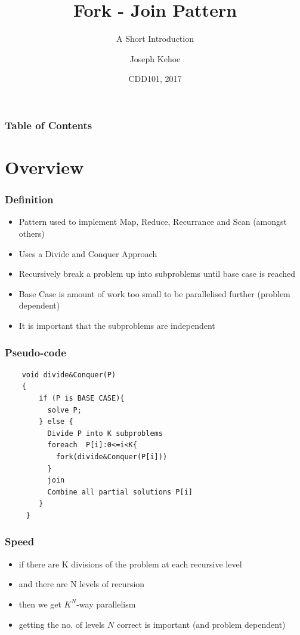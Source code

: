 \documentclass{beamer}
\title[Fork-Join] %
{Fork - Join Pattern}
\subtitle{A Short Introduction}
\author[Dr. Joseph Kehoe] %
{Joseph Kehoe\inst{1}}
\institute[IT Carlow] %
{
	\inst{1}%
	Department of Computing and Networking\\
	Institute of Technology Carlow
}
\date[ITC 2017] %
{CDD101, 2017}
\begin{document}
 
\frame{\titlepage}
 
 
 
 \begin{frame}
 	\frametitle{Table of Contents}
 	\tableofcontents
 \end{frame}
 
 
 \section{Overview}
\begin{frame}
\frametitle{Definition}

\begin{itemize}
	\item Pattern used to implement Map, Reduce, Recurrance and Scan (amongst others)
	\item Uses a Divide and Conquer Approach
	\item Recursively break a problem up into subproblems until base case is reached
	\item Base Case is amount of work too small to be parallelised further (problem dependent)
	\item It is important that the subproblems are independent
\end{itemize}
\end{frame}


 \begin{frame}[fragile=singleslide]
 	\frametitle{Pseudo-code}
\begin{lstlisting}
 	void divide&Conquer(P)
 	{
	 	if (P is BASE CASE){
	 	  solve P;
	 	} else {
	 	  Divide P into K subproblems
	 	  foreach  P[i]:0<=i<K{
	 	    fork(divide&Conquer(P[i]))
	 	  }
	 	  join
	 	  Combine all partial solutions P[i] 
	 	}
	 }
 \end{lstlisting}
 \end{frame}
 
\begin{frame}
	\frametitle{Speed}
\begin{itemize}
\item if there are K divisions of the problem at each recursive level
\item and there are N levels of recursion
\item then we get $K^{N}$-way parallelism
\item getting the no. of levels $N$ correct is important (and problem dependent)
\end{itemize}
\end{frame}
\end{document}
